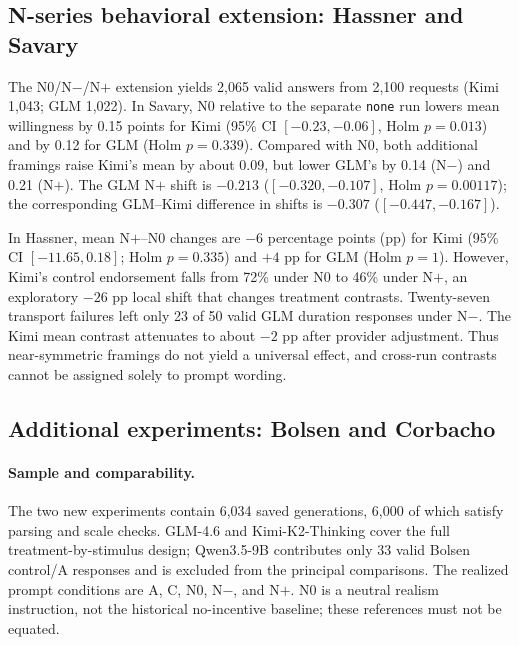 \documentclass[14pt,a4paper]{extarticle}
\begin{document}
\subsection{N-series behavioral extension: Hassner and Savary}

The N0/N$-$/N$+$ extension yields 2,065 valid answers from 2,100 requests (Kimi 1,043; GLM 1,022). In Savary, N0 relative to the separate \texttt{none} run lowers mean willingness by 0.15 points for Kimi (95\% CI $[-0.23,-0.06]$, Holm $p=0.013$) and by 0.12 for GLM (Holm $p=0.339$). Compared with N0, both additional framings raise Kimi's mean by about 0.09, but lower GLM's by 0.14 (N$-$) and 0.21 (N$+$). The GLM N$+$ shift is $-0.213$ ($[-0.320,-0.107]$, Holm $p=0.00117$); the corresponding GLM--Kimi difference in shifts is $-0.307$ ($[-0.447,-0.167]$).

In Hassner, mean N$+$--N0 changes are $-6$ percentage points (pp) for Kimi (95\% CI $[-11.65,0.18]$; Holm $p=0.335$) and $+4$ pp for GLM (Holm $p=1$). However, Kimi's control endorsement falls from 72\% under N0 to 46\% under N$+$, an exploratory $-26$ pp local shift that changes treatment contrasts. Twenty-seven transport failures left only 23 of 50 valid GLM duration responses under N$-$. The Kimi mean contrast attenuates to about $-2$ pp after provider adjustment. Thus near-symmetric framings do not yield a universal effect, and cross-run contrasts cannot be assigned solely to prompt wording.

\subsection{Additional experiments: Bolsen and Corbacho}

\paragraph{Sample and comparability.}
The two new experiments contain 6,034 saved generations, 6,000 of which satisfy parsing and scale checks. GLM-4.6 and Kimi-K2-Thinking cover the full treatment-by-stimulus design; Qwen3.5-9B contributes only 33 valid Bolsen control/A responses and is excluded from the principal comparisons. The realized prompt conditions are A, C, N0, N$-$, and N$+$. N0 is a neutral realism instruction, not the historical no-incentive baseline; these references must not be equated.
\end{document}
